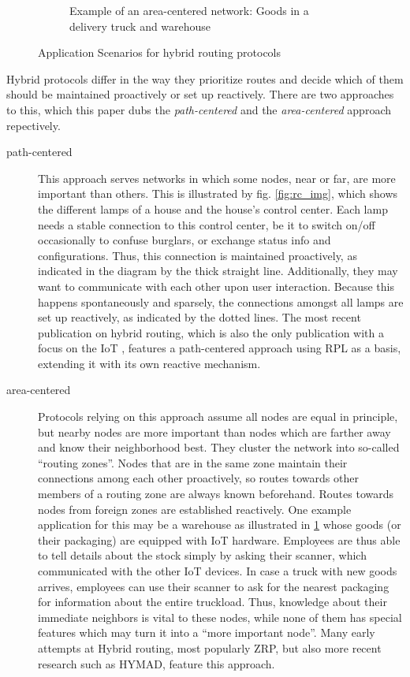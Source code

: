 \documentclass[a4paper,10pt]{scrartcl}
\begin{document}
\begin{figure}
\begin{subfigure}[b]{0.5\textwidth}
                \caption{Example of an area-centered network: Goods in a delivery truck and warehouse}
                \label{fig:ac_img}
        \end{subfigure}
        \caption{Application Scenarios for hybrid routing protocols}\label{fig:scope}
\end{figure}

Hybrid protocols differ in the way they prioritize routes and decide which of them should be maintained proactively or set up reactively. There are two approaches to this, which this paper dubs the \emph{path-centered} and the \emph{area-centered} approach repectively.\\

\begin{description}
\item[path-centered] This approach serves networks in which some nodes, near or far, are more important than others. This is illustrated by fig. \ref{fig:rc_img}, which shows the different lamps of a house and the house's control center. Each lamp needs a stable connection to this control center, be it to switch on/off occasionally to confuse burglars, or exchange status info and configurations. Thus, this connection is maintained proactively, as indicated in the diagram by the thick straight line. Additionally, they may want to communicate with each other upon user interaction. Because this happens spontaneously and sparsely, the connections amongst all lamps are set up reactively, as indicated by the dotted lines.
The most recent publication on hybrid routing, which is also the only publication with a focus on the IoT \cite{RFC-6997}, features a path-centered approach using \gls{RPL}\cite{RFC-6550} as a basis, extending it with its own reactive mechanism.
\\
\item[area-centered] Protocols relying on this approach assume all nodes are equal in principle, but nearby nodes are more important than nodes which are farther away and know their neighborhood best. They cluster the network into so-called ``routing zones''. Nodes that are in the same zone maintain their connections among each other proactively, so routes towards other members of a routing zone are always known beforehand. Routes towards nodes from foreign zones are established reactively. 
One example application for this may be a warehouse as illustrated in \ref{fig:ac_img} whose goods (or their packaging) are equipped with IoT hardware. Employees are thus able to tell details about the stock simply by asking their scanner, which communicated with the other IoT devices. In case a truck with new goods arrives, employees can use their scanner to ask for the nearest packaging for information about the entire truckload. Thus, knowledge about their immediate neighbors is vital to these nodes, while none of them has special features which may turn it into a ``more important node''. Many early attempts at Hybrid routing, most popularly \gls{ZRP}, but also more recent research such as HYMAD, feature this approach.
\end{description}
\end{document}
